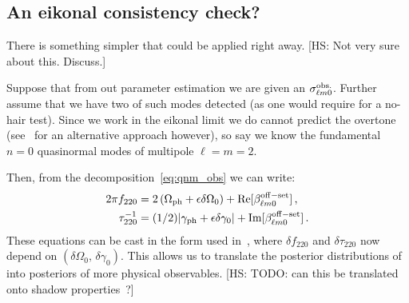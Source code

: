 \documentclass[aps,prd,10pt,preprint,
               notitlepage,onecolumn,superscriptaddress,
               eqsecnum,
               nofootinbib,tightenlines,floatfix]{revtex4-2}
\newcommand{\hs}[1]{{\color{magenta}[HS: #1]}}
\begin{document}
\subsection{An eikonal consistency check?}

There is something simpler that could be applied right away.
\hs{Not very sure about this. Discuss.}

Suppose that from out parameter estimation we are given an
%
$\sigma_{\ell m 0}^{\rm obs.}$.
%
Further assume that we have two of such modes detected (as one would require
for a no-hair test). Since we work in the eikonal limit we do cannot predict the
overtone (see~\cite{Dolan:2009nk} for an alternative approach however), so say we know the fundamental $n=0$
quasinormal modes of multipole $\ell = m = 2$.

Then, from the decomposition~\eqref{eq:qnm_obs} we can write:
%
\begin{subequations}
\begin{align}
    2 \pi f_{220} &= 2 \left( \Omega_{\rm ph} + \epsilon \delta \Omega_{0} \right) + {\rm  Re}[\beta^{\rm off-set}_{\ell m 0}]\,,
    \\
    \tau^{-1}_{220} &= (1/2) |\gamma_{\rm ph} + \epsilon \delta \gamma_{0}| + {\rm  Im}[\beta^{\rm off-set}_{\ell m 0}]\,.
\end{align}
\end{subequations}
%
These equations can be cast in the form used in~\cite{Ghosh:2021mrv}, where $\delta f_{220}$
and $\delta \tau_{220}$ now depend on $(\delta \Omega_0,\, \delta \gamma_0)$.
%
This allows us to translate the posterior distributions of~\cite{Ghosh:2021mrv} into posteriors of more
physical observables.
%
\hs{TODO: can this be translated onto shadow properties~\cite{Yang:2021zqy}?}
\end{document}
